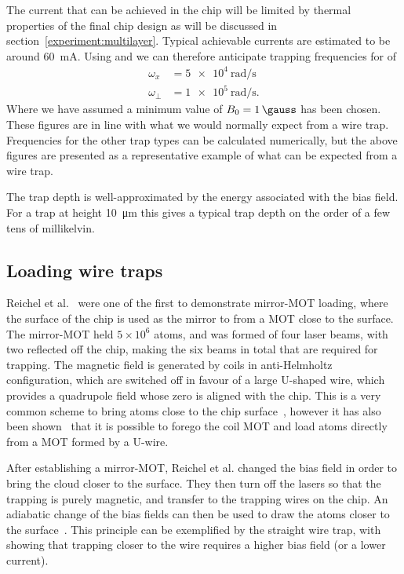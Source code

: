 The current that can be achieved in the chip will be limited by thermal
properties of the final chip design as will be discussed in
section~\ref{experiment:multilayer}. Typical achievable currents are estimated
to be around \SI{60}{\milli\ampere}. 
Using  and
 we can therefore anticipate trapping frequencies
for \CaF{} of
%
\begin{align}
  \omega_x &= \SI{5e4}{\radian \per \second} \\
  \omega_\perp &= \SI{1e5}{\radian \per \second}.
\end{align}
%
Where we have assumed a minimum value of $B_0 = \SI{1}{\gauss}$ has been chosen.
These figures are in line with what we would normally expect from a wire
trap.~\cite{2011Ac}
Frequencies for the other trap types can be calculated numerically, but the
above figures are presented as a representative example of what can be expected
from a wire trap.

The trap depth is well-approximated by the energy associated with the bias
field. For a trap at height \SI{10}{\micro\metre} this gives a typical trap
depth on the order of a few tens of millikelvin.~\cite{2011Ac}

\subsection{Loading wire traps}

Reichel et al.~\cite{Reichel1999} were one of the first to demonstrate
mirror-MOT loading, where the surface of the chip is used as the mirror to from
a MOT close to the surface. The mirror-MOT held $5\times10^6$ \esRb{} atoms,
and was formed of four laser beams, with two reflected off the chip, making the
six beams in total that are required for trapping. The magnetic field is
generated by coils in anti-Helmholtz configuration, which are switched off in
favour of a large U-shaped wire, which provides a quadrupole field whose zero is
aligned with the chip. This is a very common scheme to bring atoms close to the
chip surface~\cite{Folman2000, PhysRevLett.97.200405, 2011Ac, Boehi2009},
however it has also been shown~\cite{0256-307X-25-9-034} that it is possible to
forego the coil MOT and load atoms directly from a MOT formed by a U-wire.

After establishing a mirror-MOT, Reichel et al. changed the bias field in order
to bring the cloud closer to the surface. They then turn off the lasers so that
the trapping is purely magnetic, and transfer to the trapping
wires on the chip. An adiabatic change of the bias fields can then be used to
draw the atoms closer to the surface~\cite{Reichel1999, Folman2000}. This
principle can be exemplified by the straight wire trap, with
 showing that trapping closer to the wire requires a
higher bias field (or a lower current).

